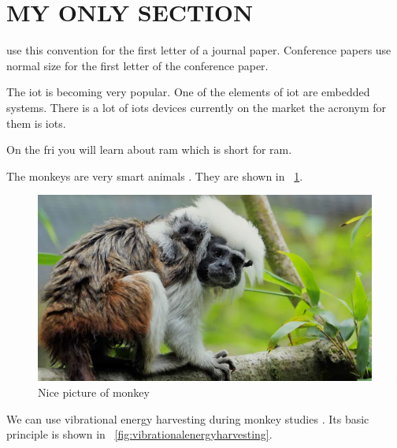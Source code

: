 \section{MY ONLY SECTION}

	\ifCLASSOPTIONjournal
		 use this convention for the first letter of a journal paper.
	\else
		Conference papers use normal size for the first letter of the conference paper.
	\fi	

The \ac{iot} is becoming very popular. One of the elements of \ac{iot} are embedded systems. There is a lot of \aclp{iot} devices currently on the market the acronym for them is \acsp{iot}.

On the \acf{fri} you will learn about \acs{ram} which is short for \acl{ram}.

The monkeys are very smart animals \cite{article_first}. They are shown in \figurename ~\ref{fig:monkey}. 

\begin{figure}[ht]
	\centering
	\includegraphics[width=1.0\linewidth]{pictures/monkey}
	\caption{Nice picture of monkey \cite{figure_first}}
	\label{fig:monkey}
\end{figure}


We can use vibrational energy harvesting during monkey studies \cite{article_second}. Its basic principle is shown in \figurename  ~\ref{fig:vibrationalenergyharvesting}.

